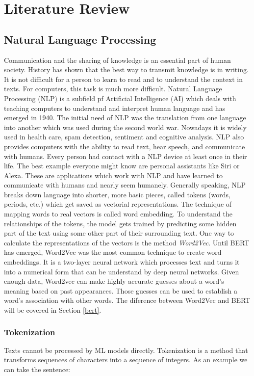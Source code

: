 \chapter{Literature Review} \label{chapter:literaturereview}

\section{Natural Language Processing}
Communication and the sharing of knowledge is an essential part of human society. History has shown that the best way to transmit knowledge is in writing. It is not difficult for a person to learn to read and to understand the context in texts. For computers, this task is much more difficult. Natural Language Processing (NLP) is a subfield pf Artificial Intelligence (AI) which deals with teaching computers to understand and interpret human language and has emerged in 1940. The initial need of NLP was the translation from one language into another which was used during the second world war. Nowadays it is widely used in health care, spam detection, sentiment and cognitive analysis. NLP also provides computers with the ability to read text, hear speech, and communicate with humans. Every person had contact with a NLP device at least once in their life. The best example everyone might know are personal assistants like Siri or Alexa. These are applications which work with NLP and have learned to communicate with humans and nearly seem humanely.\newline
Generally speaking, NLP breaks down language into shorter, more basic pieces, called tokens (words, periods, etc.) which get saved as vectorial representations. The technique of mapping words to real vectors is called word embedding. To understand the relationships of the tokens, the model gets trained by predicting some hidden part of the text using some other part of their surrounding text. One way to calculate the representations of the vectors is the method \textit{Word2Vec}. Until BERT has emerged, Word2Vec was the most common technique to create word embeddings. It is a two-layer neural network which processes text and turns it into a numerical form that can be understand by deep neural networks. Given enough data, Word2vec can make highly accurate guesses about a word’s meaning based on past appearances. Those guesses can be used to establish a word’s association with other words. The diference between Word2Vec and BERT will be covered in Section \ref{bert}.

\subsection{Tokenization}
Texts cannot be processed by ML models directly. Tokenization is a method that transforms sequences of characters into a sequence of integers. As an example we can take the sentence: \newline

